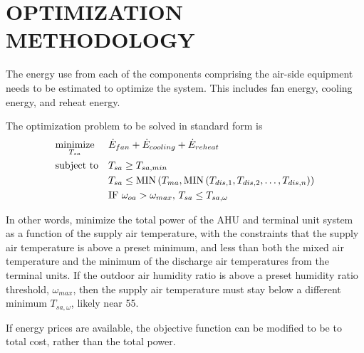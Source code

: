 
%
%
%

\chapter{\texorpdfstring{\MakeUppercase{Optimization Methodology}}{Optimization Methodology}}

The energy use from each of the components comprising the air-side
equipment needs to be estimated to optimize the system. This includes
fan energy, cooling energy, and reheat energy.

The optimization problem to be solved in standard form is
\begin{equation}
    \begin{aligned}
        & \underset{T_{sa}{}}{\text{minimize}} & & \dot{E}_{fan} + \dot{E}_{cooling} + \dot{E}_{reheat} \\
        & \text{subject to} & & T_{sa}{} \geq T_{sa,min} \\
        &&& T_{sa}{} \leq \text{MIN}\left(T_{ma}, \text{MIN}\left(T_{dis,1}, T_{dis,2}, \ldots, T_{dis,n} \right) \right) \\
        &&& \text{IF } \omega_{oa} > \omega_{max},\,T_{sa}{} \leq T_{sa,\omega}
    \end{aligned}
\end{equation}

In other words, minimize the total power of the AHU and terminal unit
system as a function of the supply air temperature, with the constraints
that the supply air temperature is above a preset minimum, and less than
both the mixed air temperature and the minimum of the discharge air
temperatures from the terminal units. If the outdoor air humidity ratio
is above a preset humidity ratio threshold, \(\omega_{max}\), then the
supply air temperature must stay below a different minimum
\(T_{sa,\omega}\), likely near \SI{55}{\degF}.

If energy prices are available, the objective function can be modified
to be to total cost, rather than the total power.

